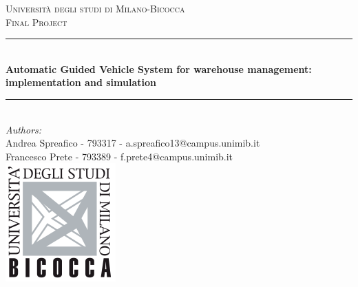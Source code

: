 \documentclass[12pt]{article}
\begin{document}
\begin{titlepage}

\newcommand{\HRule}{\rule{\linewidth}{0.5mm}} %


\center %
 

\textsc{\LARGE Università degli studi di Milano-Bicocca}\\[1cm] %
\textsc{\large Final Project}\\[0.1cm] %


\HRule \\[0.4cm]
{ \LARGE \bfseries Automatic Guided Vehicle System for warehouse management: implementation and simulation}\\[0.4cm] %
\HRule \\[1.5cm]
 

\large
\emph{Authors:}\\
Andrea Spreafico - 793317 - a.spreafico13@campus.unimib.it \\   %
Francesco Prete - 793389 - f.prete4@campus.unimib.it   \\[2cm] %


\includegraphics{logo.png}\\[1cm] %
 

\end{titlepage}
\end{document}
